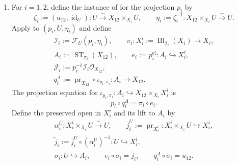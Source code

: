 \begin{definition}
\begin{enumerate}
\[        \qquad
        u_{12}:=\gamma_{12}^{\mathrm{im}}\colon U\to X_{12},
        \qquad
        c_{12}\circ u_{12}=\gamma_{12}.                           \tag{CM0c'}
      \]
      Stability of separatedness and finite type under base change and
      composition, applied to the closed immersion \(c_{12}\) and the two
      projections, is the predicate pair
      \[
        \operatorname{Separated}(p_i),\qquad
        \operatorname{FiniteType}(p_i).
      \]
    \item For \(i=1,2\), define the instance of
       for the projection
      \(p_i\) by
      \[
        \zeta_i:=(u_{12},\operatorname{id}_U)\colon
          U\xrightarrow{\sim}X_{12}\times_{X_i}U,\qquad
        \eta_i:=\zeta_i^{-1}\colon
          X_{12}\times_{X_i}U\xrightarrow{\sim}U.                 \tag{CM0d}
      \]
      Apply
       to $(p_i,U,\eta_i)$ and
      define
      \[
      \begin{gathered}
        \mathcal I_i:=\mathcal F_U(p_i,\eta_i),\qquad
        \pi_i\colon X_i^i:=
          \operatorname{Bl}_{\mathcal I_i}(X_i)\to X_i,\\
        A_i:=\operatorname{ST}_{\pi_i}(X_{12}),\qquad
        e_i:=p_i^{\mathrm{el}}\colon A_i\hookrightarrow X_i^i,\\
        \mathcal J_i:=p_i^{-1}\mathcal I_i\mathcal O_{X_{12}},\\
        q_i^A:=\operatorname{pr}_{X_{12}}\circ\iota_{p_i,\pi_i}
          \colon A_i\longrightarrow X_{12}.
      \end{gathered}
      \]
      The projection equation for
      \(\iota_{p_i,\pi_i}\colon
        A_i\hookrightarrow X_{12}\times_{X_i}X_i^i\) is
      \[
        p_i\circ q_i^A=\pi_i\circ e_i.
      \]
      Define the preserved open in \(X_i^i\) and its lift to \(A_i\) by
      \[
      \begin{gathered}
        \alpha_i^U\colon X_i^i\times_{X_i}U\xrightarrow{\sim}U,\qquad
        \overline j_i^U:=\operatorname{pr}_{X_i^i}
          \colon X_i^i\times_{X_i}U\hookrightarrow X_i^i,\\
        \widetilde j_i:=
          \overline j_i^U\circ(\alpha_i^U)^{-1}
          \colon U\hookrightarrow X_i^i,\\
        \sigma_i\colon U\hookrightarrow A_i,\qquad
        e_i\circ\sigma_i=\widetilde j_i,\qquad
        q_i^A\circ\sigma_i=u_{12}.
      \end{gathered}                                                \tag{CM0c}
\]
\end{enumerate}
\end{definition}
